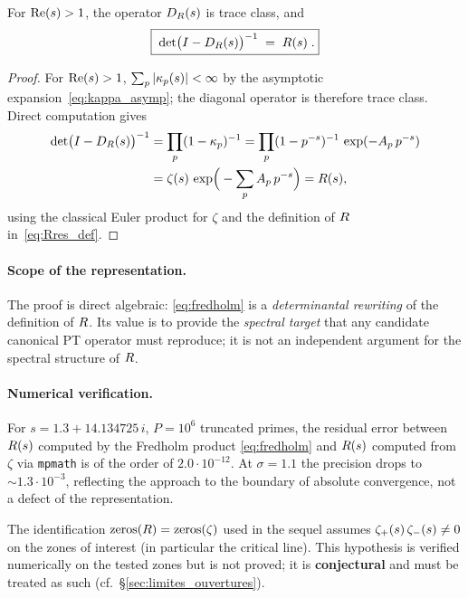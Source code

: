 \begin{theoreme}
\label{thm:fredholm}
For $\operatorname{Re}(s) > 1$, the operator $D_R(s)$ is trace class, and
\begin{equation}
\boxed{\;\det\!\big(I - D_R(s)\big)^{-1} \;=\; R(s)\;.}
\label{eq:fredholm}
\end{equation}
\end{theoreme}

\begin{proof}
For $\operatorname{Re}(s) > 1$, $\sum_p |\kappa_p(s)| < \infty$ by the asymptotic
expansion~\eqref{eq:kappa_asymp}; the diagonal operator is therefore trace
class. Direct computation gives
\begin{align*}
\det\!\big(I - D_R(s)\big)^{-1}
&= \prod_p (1 - \kappa_p)^{-1}
= \prod_p (1 - p^{-s})^{-1}\,\exp(-A_p\,p^{-s})\\
&= \zeta(s)\,\exp\!\Big(-\sum_p A_p\,p^{-s}\Big)
= R(s),
\end{align*}
using the classical Euler product for $\zeta$ and the definition of
$R$ in~\eqref{eq:Rres_def}.
\end{proof}

\paragraph{Scope of the representation.}
The proof is direct algebraic: \eqref{eq:fredholm} is a
\emph{determinantal rewriting} of the definition of $R$. Its value is
to provide the \emph{spectral target} that any candidate canonical PT
operator must reproduce; it is not an independent argument for the
spectral structure of $R$.

\paragraph{Numerical verification.}
For $s = 1.3 + 14.134725\,i$, $P = 10^{6}$ truncated primes, the residual
error between $R(s)$ computed by the Fredholm product
\eqref{eq:fredholm} and $R(s)$ computed from $\zeta$ via
\texttt{mpmath} is of the order of $2.0 \cdot 10^{-12}$. At $\sigma = 1.1$
the precision drops to $\sim 1.3 \cdot 10^{-3}$, reflecting the approach
to the boundary of absolute convergence, not a defect of the
representation.

\begin{remarque}
\label{rem:non_annulation}
The identification $\mathrm{zeros}(R) = \mathrm{zeros}(\zeta)$
used in the sequel assumes
$\zeta_{+}(s)\,\zeta_{-}(s) \neq 0$ on the zones of interest (in
particular the critical line). This hypothesis is verified
numerically on the tested zones but is not proved; it is
\textbf{conjectural} and must be treated as such
(cf.~\S\ref{sec:limites_ouvertures}).
\end{remarque}

